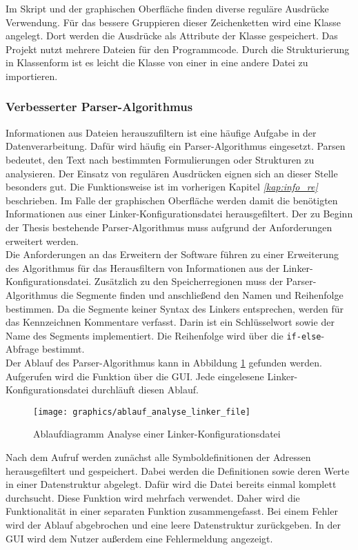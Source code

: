 Im Skript und der graphischen Oberfläche finden diverse reguläre Ausdrücke Verwendung.
Für das bessere Gruppieren dieser Zeichenketten wird eine Klasse angelegt.
Dort werden die Ausdrücke als Attribute der Klasse gespeichert.
Das Projekt nutzt mehrere Dateien für den Programmcode.
Durch die Strukturierung in Klassenform ist es leicht die Klasse von einer in eine andere Datei zu importieren.

\subsubsection{Verbesserter Parser-Algorithmus}\label{kap:verbesserung_parser}
Informationen aus Dateien herauszufiltern ist eine häufige Aufgabe in der Datenverarbeitung.
Dafür wird häufig ein Parser-Algorithmus eingesetzt.
Parsen bedeutet, den Text nach bestimmten Formulierungen oder Strukturen zu analysieren.
Der Einsatz von regulären Ausdrücken eignen sich an dieser Stelle besonders gut.
Die Funktionsweise ist im vorherigen Kapitel \textit{\ref{kap:info_re} } beschrieben.
Im Falle der graphischen Oberfläche werden damit die benötigten Informationen aus einer Linker-Konfigurationsdatei herausgefiltert.
Der zu Beginn der Thesis bestehende Parser-Algorithmus muss aufgrund der Anforderungen erweitert werden. \\

Die Anforderungen an das Erweitern der Software führen zu einer Erweiterung des Algorithmus für das Herausfiltern von Informationen aus der Linker-Konfigurationsdatei.
Zusätzlich zu den Speicherregionen muss der Parser-Algorithmus die Segmente finden und anschließend den Namen und Reihenfolge bestimmen.
Da die Segmente keiner Syntax des Linkers entsprechen, werden für das Kennzeichnen Kommentare verfasst.
Darin ist ein Schlüsselwort sowie der Name des Segments implementiert.
Die Reihenfolge wird über die \verb*|if-else|-Abfrage bestimmt. \\

Der Ablauf des Parser-Algorithmus kann in Abbildung \ref{fig:ablaufanalyselinkerfile} gefunden werden.
Aufgerufen wird die Funktion über die \ac{GUI}.
Jede eingelesene Linker-Konfigurationsdatei durchläuft diesen Ablauf. \\

\begin{figure}[H]
	\centering
	\texttt{[image: graphics/ablauf\_analyse\_linker\_file]}
	\caption{Ablaufdiagramm Analyse einer Linker-Konfigurationsdatei}
	\label{fig:ablaufanalyselinkerfile}
\end{figure}
Nach dem Aufruf werden zunächst alle Symboldefinitionen der Adressen herausgefiltert und gespeichert.
Dabei werden die Definitionen sowie deren Werte in einer Datenstruktur abgelegt.
Dafür wird die Datei bereits einmal komplett durchsucht.
Diese Funktion wird mehrfach verwendet.
Daher wird die Funktionalität in einer separaten Funktion zusammengefasst.
Bei einem Fehler wird der Ablauf abgebrochen und eine leere Datenstruktur zurückgeben.
In der \ac{GUI} wird dem Nutzer außerdem eine Fehlermeldung angezeigt. \\

